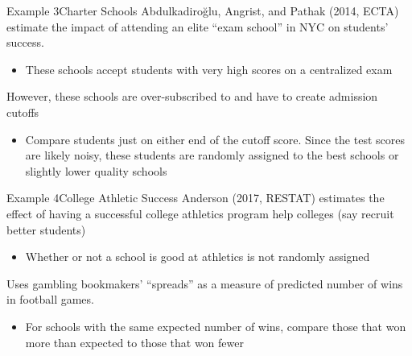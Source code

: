 \documentclass[aspectratio=169,t,11pt,table]{beamer}
\begin{document}
\begin{frame}{Example 3}{Charter Schools}
  Abdulkadiroğlu, Angrist, and Pathak (2014, ECTA) estimate the impact of attending an elite ``exam school'' in NYC on students' success.
  \begin{itemize}
    \item These schools accept students with very high scores on a centralized exam
  \end{itemize}

  \pause
  \bigskip
  However, these schools are over-subscribed to and have to create admission cutoffs 
  \begin{itemize}
    \item Compare students just on either end of the cutoff score. Since the test scores are likely noisy, these students are randomly assigned to the best schools or slightly lower quality schools
  \end{itemize}
\end{frame}


\begin{frame}{Example 4}{College Athletic Success}
  Anderson (2017, RESTAT) estimates the effect of having a successful college athletics program help colleges (say recruit better students)

  \begin{itemize}
    \item Whether or not a school is good at athletics is not randomly assigned
  \end{itemize}
  
  \pause
  \bigskip
  Uses gambling bookmakers' ``spreads'' as a measure of predicted number of wins in football games. 
  \begin{itemize}
    \item For schools with the same expected number of wins, compare those that won more than expected to those that won fewer
  \end{itemize}
\end{frame}
\end{document}
